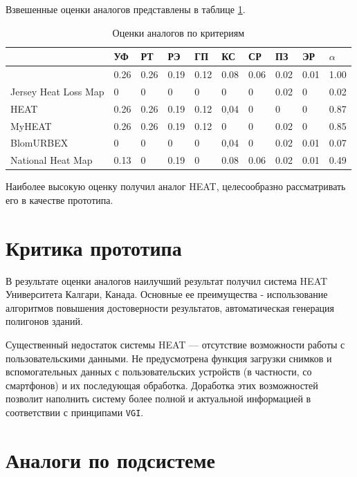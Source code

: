 	\pagebreak

	Взвешенные оценки аналогов представлены в таблице \ref{table:weightedest}.

	\begin{table}[h!]
		\begin{center}
			\caption{Оценки аналогов по критериям}
			\begin{tabular}{ | l | l | l | l | l | l | l | l | l | l | }	
				\hline
				 	&УФ &РТ &РЭ &ГП &КС &СР &ПЗ &ЭР &$\alpha$\\
				\hline
					&0.26 &0.26 &0.19 &0.12 &0.08 &0.06 &0.02 &0.01 &1.00 \\
				\hline
					Jersey Heat Loss Map &0 &0 &0 &0 &0 &0 &0.02 &0 &0.02 \\
				\hline
					HEAT &0.26 &0.26 &0.19 &0.12 &0,04 &0 &0 &0 &0.87 \\
				\hline
					MyHEAT &0.26 &0.26 &0.19 &0.12 &0 &0 &0.02 &0 &0.85 \\
				\hline
					BlomURBEX &0 &0 &0 &0 &0,04 &0 &0.02 &0.01 &0.07 \\
				\hline
					National Heat Map &0.13 &0 &0.19 &0 &0.08 &0.06 &0.02 &0.01 &0.49 \\
				\hline
			\end{tabular}
			\label{table:weightedest}
		\end{center}
	\end{table}

	Наиболее высокую оценку получил аналог HEAT, целесообразно рассматривать его в качестве прототипа.

\section{Критика прототипа}

\par
	В результате оценки аналогов наилучший результат получил система HEAT Университета Калгари, Канада. Основные ее преимущества - использование алгоритмов повышения достоверности результатов, автоматическая генерация полигонов зданий.
	
	Существенный недостаток системы HEAT --- отсутствие возможности работы с пользовательскими данными. Не предусмотрена функция загрузки снимков и вспомогательных данных с пользовательских устройств (в частности, со смартфонов) и их последующая обработка. Доработка этих возможностей позволит наполнить систему более полной и актуальной информацией в соответствии с принципами \texttt{VGI}. 


\section{Аналоги по подсистеме}

